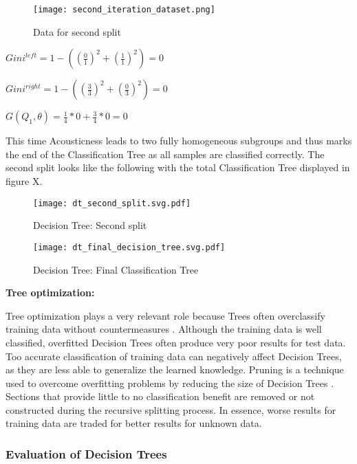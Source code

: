 \begin{figure}[H]
    \centering
    \caption[]{Data for second split}
	\label{fig:second_iteration_dataset}
    \texttt{[image: second\_iteration\_dataset.png]}
\end{figure}

\(Gini^{left} = 1 - ((\frac{0}{1})^2 + (\frac{1}{1})^2) = 0 \)

\(Gini^{right}  = 1 - ((\frac{3}{3})^2 + (\frac{0}{3})^2) = 0 \)

\(G(Q_{1},\theta) = \frac{1}{4} * 0 + \frac{3}{4} * 0 = 0 \)

This time Acousticness leads to two fully homogeneous subgroups and thus marks the end of the Classification Tree as all samples are 
classified correctly. The second split looks like the following with the total Classification Tree displayed in figure X.

\begin{figure}[H]
    \centering
    \caption[]{Decision Tree: Second split}
	\label{fig:dt_second_split}
    \texttt{[image: dt\_second\_split.svg.pdf]}
\end{figure}

\begin{figure}[H]
    \centering
    \caption[]{Decision Tree: Final Classification Tree}
	\label{fig:dt_final_decision_tree}
    \texttt{[image: dt\_final\_decision\_tree.svg.pdf]}
\end{figure}

\textbf{Tree optimization:}

Tree optimization plays a very relevant role because Trees often overclassify training data 
without countermeasures \cite[p.7]{lewis2000introduction}. Although the training data is well classified, overfitted Decision 
Trees often produce very poor results for test data. Too accurate classification of training 
data can negatively affect Decision Trees, as they are less able to generalize the learned 
knowledge. Pruning is a technique used to overcome overfitting problems by reducing the size of 
Decision Trees \cite[p.331]{James2021}. Sections that provide little to no classification benefit are removed or not 
constructed during the recursive splitting process. In essence, worse results for training data 
are traded for better results for unknown data.

\subsubsection{Evaluation of Decision Trees}


